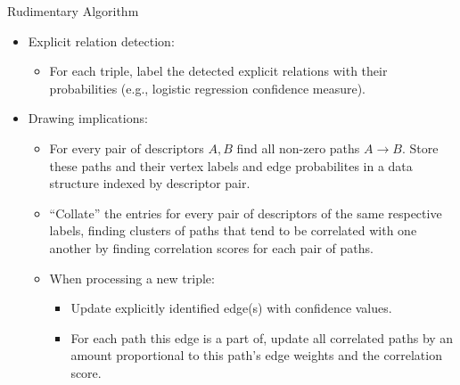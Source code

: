 \documentclass[a4paper]{article}
\begin{document}
Rudimentary Algorithm
\begin{itemize}
    \item Explicit relation detection:
    \begin{itemize}
        \item For each triple, label the detected explicit relations with their
            probabilities (e.g., logistic regression confidence measure).
    \end{itemize}
    \item Drawing implications:
    \begin{itemize}
        \item For every pair of descriptors $A, B$ find all non-zero paths $A
            \rightarrow B$. Store these paths and their vertex labels and edge
            probabilites in a data structure indexed by descriptor pair.
        \item ``Collate'' the entries for every pair of descriptors of the same
            respective labels, finding clusters of paths that tend to be
            correlated with one another by finding correlation scores for each
            pair of paths.
        \item When processing a new triple:
        \begin{itemize}
            \item Update explicitly identified edge(s) with confidence values.
            \item For each path this edge is a part of, update all correlated
                paths by an amount proportional to this path's edge weights and
                the correlation score.
        \end{itemize}
    \end{itemize}
\end{itemize}

%
%
\end{document}

